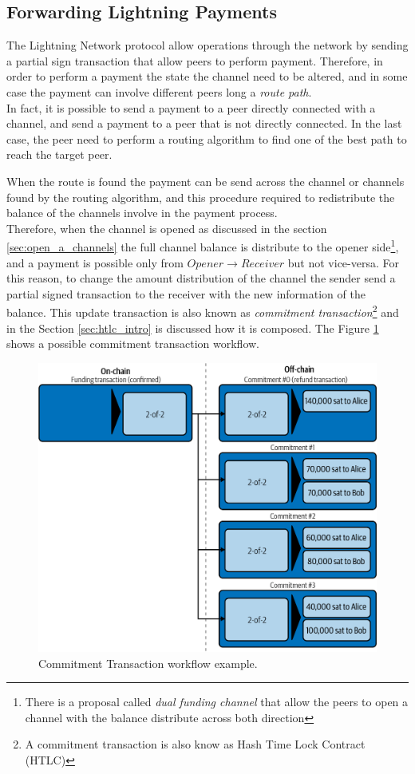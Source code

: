 \subsection{Forwarding Lightning Payments}

The Lightning Network protocol allow operations through the network by sending a partial sign transaction that
allow peers to perform payment.
Therefore, in order to perform a payment the state the channel need to be altered, and in some case the payment can involve
different peers long a \emph{route path}.\\
In fact, it is possible to send a payment to a peer directly connected with a channel, and send a payment to a peer
that is not directly connected. In the last case, the peer need to perform a routing algorithm
to find one of the best path to reach the target peer.

When the route is found the payment can be send across the channel or channels found by the routing algorithm, and this procedure
required to redistribute the balance of the channels involve in the payment process.\\
Therefore, when the channel is opened as discussed in the section \ref{sec:open_a_channels} the full channel balance
is distribute to the opener side\footnote{There is a proposal called \emph{dual funding channel} that allow the peers to open a channel
  with the balance distribute across both direction},
and a payment is possible only from $Opener \rightarrow Receiver$ but not vice-versa. For this reason, to change the amount distribution
of the channel the sender send a partial signed transaction to the receiver with the new information of the balance.
This update transaction is also known as \emph{commitment transaction}\footnote{A commitment transaction is also know as Hash Time Lock Contract (HTLC)} and in the Section \ref{sec:htlc_intro} is discussed how it is composed.
The Figure \ref{fig:commitment_transaction_example} shows a possible commitment transaction workflow.

\begin{figure}[h]
  \begin{center}
  \includegraphics[width=0.6\columnwidth]{imgs/mtln_0706.png}
  \end{center}
  \caption{Commitment Transaction workflow example.}
  \label{fig:commitment_transaction_example}
\end{figure}


